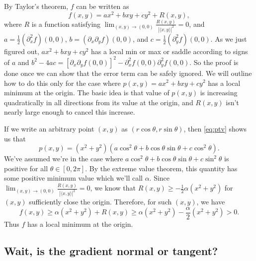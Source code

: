 \documentclass[prettycode,shellescape]{watsonbook}
\begin{document}
\begin{pf}
  By Taylor's theorem, $f$ can be written as
  \[
    f(x,y) = ax^2 + bxy + cy^2 + R(x,y), 
  \]
  where $R$ is a function satisfying
  $\lim_{(x,y) \to (0,0)}\frac{R(x,y)}{|\langle x,y \rangle|^2} = 0$,
  and $a = \tfrac{1}{2}(\partial_x^2f)(0,0)$,
  $b = (\partial_x\partial_y f)(0,0)$, and
  $c = \tfrac{1}{2}(\partial_y^2f)(0,0)$. As we just figured out,
  $ax^2 + bxy + cy^2$ has a local min or max or saddle according to
  signs of $a$ and
  $b^2 - 4ac = [\partial_x\partial_y f(0,0)]^2 -
  \partial_x^2f(0,0)\partial_y^2 f(0,0)$. So the proof is done once we
  can show that the error term can be safely ignored. We will outline
  how to do this only for the case where $p(x,y) = ax^2 + bxy + cy^2$
  has a local minimum at the origin. The basic idea is that value of
  $p(x,y)$ is increasing quadratically in all directions from its
  value at the origin, and $R(x,y)$ isn't nearly large enough to
  cancel this increase.

  If we write an arbitrary point $(x,y)$ as
  $(r\cos \theta, r\sin \theta)$, then \eqref{eq:ptv} shows us that
  \[
    p(x,y) = (x^2+y^2)(a\cos^2 \theta + b \cos \theta \sin \theta +
    c \cos^2 \theta). 
  \]
  We've assumed we're in the case where
  $a\cos^2 \theta + b \cos \theta \sin \theta + c \sin^2 \theta$ is
  positive for all $\theta \in [0,2\pi]$. By the extreme value
  theorem, this quantity has some positive minimum value which we'll
  call $\alpha$.  Since
  $\lim_{(x,y) \to (0,0)}\frac{R(x,y)}{|\langle x,y \rangle|^2} = 0$, we
  know that $R(x,y) \geq -\tfrac{1}{2}\alpha(x^2+y^2)$ for $(x,y)$
  sufficiently close the origin. Therefore, for such $(x,y)$, we have
  \[
    f(x,y)  \geq \alpha(x^2 + y^2) + R(x,y) \geq
    \alpha(x^2 + y^2) - \frac{\alpha}{2}(x^2+y^2) > 0.
  \]
  Thus $f$ has a local minimum at the origin. 
\end{pf}

\newpage

\subsection{Wait, is the gradient normal or
  tangent?} \label{sec:gradienta}
\end{document}
